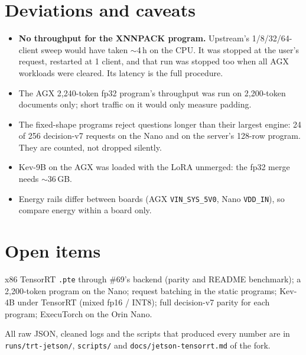 \documentclass[10pt]{article}
\begin{document}
\section{Deviations and caveats}
\begin{itemize}
\item \textbf{No throughput for the XNNPACK program.} Upstream's 1/8/32/64-client sweep would have taken $\sim$4\,h on the CPU. It was stopped at the user's request, restarted at 1 client, and that run was stopped too when all AGX workloads were cleared. Its latency is the full procedure.
\item The AGX 2{,}240-token fp32 program's throughput was run on 2{,}200-token documents only; short traffic on it would only measure padding.
\item The fixed-shape programs reject questions longer than their largest engine: 24 of 256 decision-v7 requests on the Nano and on the server's 128-row program. They are counted, not dropped silently.
\item Kev-9B on the AGX was loaded with the LoRA unmerged: the fp32 merge needs $\sim$36\,GB.
\item Energy rails differ between boards (AGX \texttt{VIN\_SYS\_5V0}, Nano \texttt{VDD\_IN}), so compare energy within a board only.
\end{itemize}

\section{Open items}
x86 TensorRT \texttt{.pte} through \#69's backend (parity and README benchmark); a 2{,}200-token program on the Nano; request batching in the static programs; Kev-4B under TensorRT (mixed fp16 / INT8); full decision-v7 parity for each program; ExecuTorch on the Orin Nano.

\medskip\noindent\small All raw JSON, cleaned logs and the scripts that produced every number are in \texttt{runs/trt-jetson/}, \texttt{scripts/} and \texttt{docs/jetson-tensorrt.md} of the fork.
\end{document}

